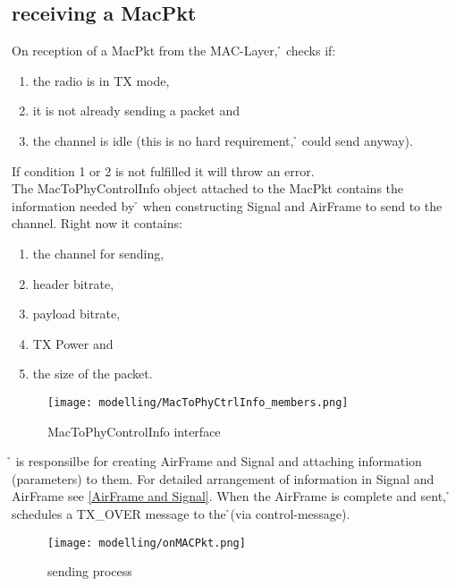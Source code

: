 \subsection{receiving a MacPkt}

On reception of a MacPkt from the MAC-Layer, \h{\bp} checks if:
\begin{enumerate}
	\item the radio is in TX mode,
	\item it is not already sending a packet and
	\item the channel is idle (this is no hard requirement, \h{\bp} could send anyway).
\end{enumerate} 

If condition 1 or 2 is not fulfilled it will throw an error.\\

The MacToPhyControlInfo object attached to the MacPkt contains the information needed by \h{\bp} when constructing Signal and AirFrame to send to the channel. Right now it contains:

\begin{enumerate}
	\item the channel for sending,
	\item header bitrate,
	\item payload bitrate,
	\item TX Power and
	\item the size of the packet.

\end{enumerate}


\begin{figure}[H]
 \centering
 \texttt{[image: modelling/MacToPhyCtrlInfo\_members.png]}
 \caption{MacToPhyControlInfo interface}
 \label{fig: MacToPhyCtrlInfo interface}
\end{figure}

\h{\bp} is responsilbe for creating AirFrame and Signal and attaching information (parameters) to them. For detailed arrangement of information in Signal and AirFrame see \ref{AirFrame and Signal}.
When the AirFrame is complete and sent, \h{\bp} schedules a TX\_OVER message to the \h{\bm}(via control-message).

\begin{figure}[H]
 \centering
 \texttt{[image: modelling/onMACPkt.png]}
 \caption{sending process}
 \label{fig: sending process}
\end{figure}





